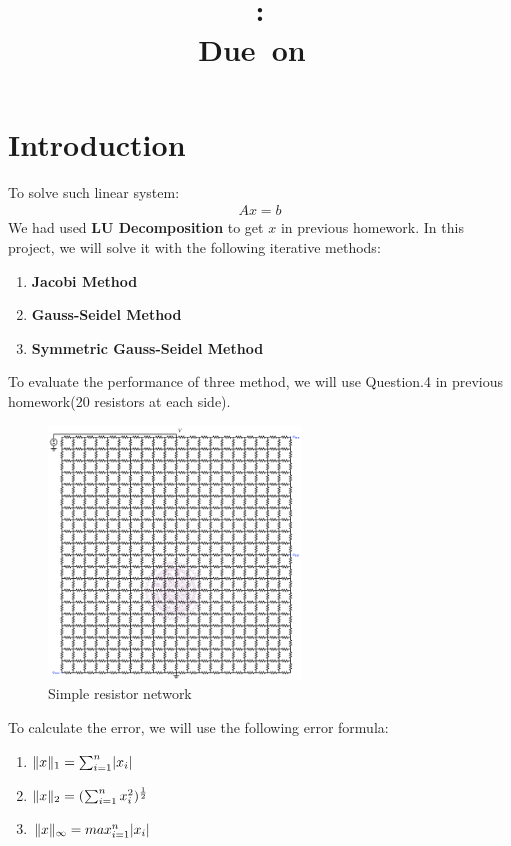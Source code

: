 \documentclass{article}
\title{
    \vspace{2in}
    \textmd{\textbf{\hmwkClass}}\\
    \textmd{\textbf{\hmwkID: \hmwkTitle}} \\
    \normalsize\vspace{0.1in}\small{Due\ on\ \hmwkDueDate}\\
    \vspace{3in}
}
\author{\textbf{\hmwkAuthorName}}
\date{} %
\DeclarePairedDelimiter{\norm}{\lVert}{\rVert}
\DeclarePairedDelimiter\abs{\lvert}{\rvert}%
\begin{document}
\maketitle
\newpage

\section{Introduction}
To solve such linear system:
\begin{gather}
    Ax = b
\end{gather}
We had used \textbf{LU Decomposition} to get $x$ in previous homework. In this project, we will solve it with the following 
iterative methods:
\begin{enumerate}
    \item \textbf{Jacobi Method}
    \item \textbf{Gauss-Seidel Method}
    \item \textbf{Symmetric Gauss-Seidel Method}
\end{enumerate}
To evaluate the performance of three method, we will use Question.4 in previous homework(20 resistors at each side).
\begin{figure}[H]
    \centering
    \includegraphics[width=0.6\textwidth]{src/network_small.png}
    \caption{Simple resistor network}
\end{figure}
To calculate the error, we will use the following error formula:
\begin{enumerate}
    \item $ \norm{x}_1 = \sum_{i=1}^{n}\abs{x_i} $
    \item $ \norm{x}_2 = (\sum_{i=1}^{n}x_i^2)^{\frac{1}{2}} $
    \item $ \norm{x}_\infty = max_{i=1}^{n}\abs{x_i}  $
\end{enumerate}
\newpage
\end{document}
